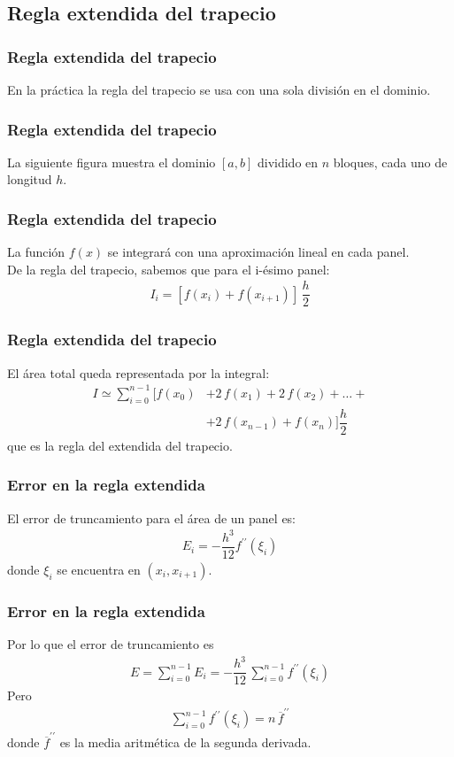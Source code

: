 \subsection{Regla extendida del trapecio}
\begin{frame}
\frametitle{Regla extendida del trapecio}
En la práctica la regla del trapecio se usa con una sola división en el dominio.
\end{frame}
\begin{frame}
\frametitle{Regla extendida del trapecio}
La siguiente figura muestra el dominio $[a,b]$ dividido en $n$ bloques, cada uno de longitud $h$.
\begin{figure}
	\centering
	
\end{figure}
\end{frame}
\begin{frame}
\frametitle{Regla extendida del trapecio}
La función $f(x)$ se integrará con una aproximación lineal en cada panel. 
\\
\bigskip
\pause
De la regla del trapecio, sabemos que para el i-ésimo panel:
\begin{align*}
I_{i} = [ f(x_{i}) + f(x_{i+1}) ] \, \dfrac{h}{2}
\end{align*}
\end{frame}
\begin{frame}
\frametitle{Regla extendida del trapecio}
El área total queda representada por la integral:
\begin{align*}
I \simeq \sum_{i=0}^{n-1} [f(x_{0}) &+ 2 \, f(x_{1}) + 2 \, f(x_{2}) + \ldots + \\ 
&+ 2 \, f(x_{n-1}) + f(x_{n})] \dfrac{h}{2}
\end{align*}
que es la regla del extendida del trapecio.
\end{frame}
\begin{frame}
\frametitle{Error en la regla extendida}
El error de truncamiento para el área de un panel es:
\begin{align*}
E_{i} = - \dfrac{h^{3}}{12} f^{\prime \prime} (\xi_{i})
\end{align*}
donde $\xi_{i}$ se encuentra en $(x_{i}, x_{i+1})$.
\end{frame}
\begin{frame}
\frametitle{Error en la regla extendida}
Por lo que el error de truncamiento es
\begin{align*}
E = \sum_{i=0}^{n-1} E_{i} = - \dfrac{h^{3}}{12} \, \sum_{i=0}^{n-1} f^{\prime \prime} (\xi_{i})
\end{align*}
\pause
Pero
\begin{align*}
\sum_{i=0}^{n-1} f^{\prime \prime} (\xi_{i}) = n \, \overline{f}^{\prime \prime}
\end{align*}
donde $\overline{f}^{\prime \prime}$ es la media aritmética de la segunda derivada.
\end{frame}
